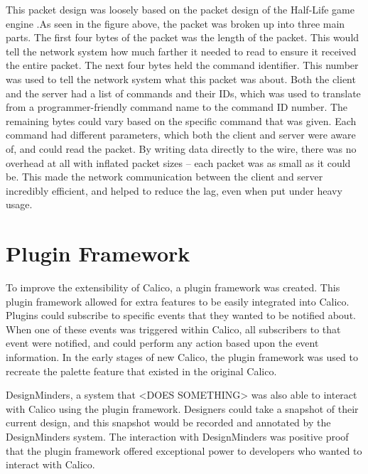 This packet design was loosely based on the packet design of the Half-Life game engine \cite{rcon}.As seen in the figure above, the packet was broken up into three main parts. The first four bytes of the packet was the length of the packet. This would tell the network system how much farther it needed to read to ensure it received the entire packet. The next four bytes held the command identifier. This number was used to tell the network system what this packet was about. Both the client and the server had a list of commands and their IDs, which was used to translate from a programmer-friendly command name to the command ID number. The remaining bytes could vary based on the specific command that was given. Each command had different parameters, which both the client and server were aware of, and could read the packet. By writing data directly to the wire, there was no overhead at all with inflated packet sizes -- each packet was as small as it could be. This made the network communication between the client and server incredibly efficient, and helped to reduce the lag, even when put under heavy usage.

\section{Plugin Framework}
To improve the extensibility of Calico, a plugin framework was created. This plugin framework allowed for extra features to be easily integrated into Calico. Plugins could subscribe to specific events that they wanted to be notified about. When one of these events was triggered within Calico, all subscribers to that event were notified, and could perform any action based upon the event information. In the early stages of new Calico, the plugin framework was used to recreate the palette feature that existed in the original Calico. 

DesignMinders\cite{todo}, a system that <DOES SOMETHING> was also able to interact with Calico using the plugin framework. Designers could take a snapshot of their current design, and this snapshot would be recorded and annotated by the DesignMinders system. The interaction with DesignMinders was positive proof that the plugin framework offered exceptional power to developers who wanted to interact with Calico.

